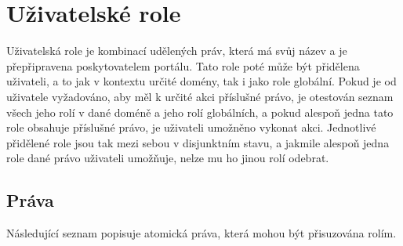 \section{Uživatelské role}
Uživatelská role je kombinací udělených práv, která má svůj název a je přepřipravena poskytovatelem portálu. Tato role poté může být přidělena uživateli, a to jak v kontextu určité domény, tak i jako role globální. Pokud je od uživatele vyžadováno, aby měl k určité akci příslušné právo, je otestován seznam všech jeho rolí v dané doméně a jeho rolí globálních, a pokud alespoň jedna tato role obsahuje příslušné právo, je uživateli umožněno vykonat akci. Jednotlivé přidělené role jsou tak mezi sebou v disjunktním stavu, a jakmile alespoň jedna role dané právo uživateli umožňuje, nelze mu ho jinou rolí odebrat.

\subsection{Práva}
Následující seznam popisuje atomická práva, která mohou být přisuzována rolím.

